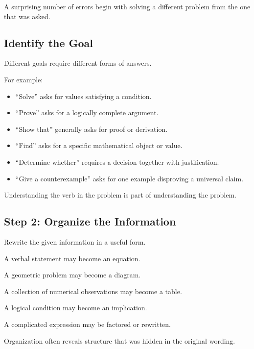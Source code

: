 A surprising number of errors begin with solving a different problem from the
one that was asked.

\subsection{Identify the Goal}
\label{subsec:identify-goal}

Different goals require different forms of answers.

For example:

\begin{itemize}
    \item ``Solve'' asks for values satisfying a condition.
    \item ``Prove'' asks for a logically complete argument.
    \item ``Show that'' generally asks for proof or derivation.
    \item ``Find'' asks for a specific mathematical object or value.
    \item ``Determine whether'' requires a decision together with justification.
    \item ``Give a counterexample'' asks for one example disproving a universal claim.
\end{itemize}

Understanding the verb in the problem is part of understanding the problem.

\subsection{Step 2: Organize the Information}
\label{subsec:organize-information}

Rewrite the given information in a useful form.

A verbal statement may become an equation.

A geometric problem may become a diagram.

A collection of numerical observations may become a table.

A logical condition may become an implication.

A complicated expression may be factored or rewritten.

Organization often reveals structure that was hidden in the original wording.

